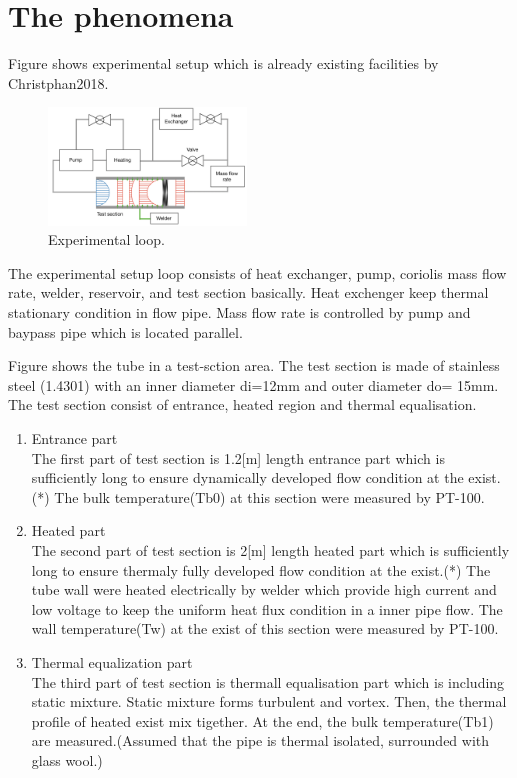 \documentclass[conference]{IEEEtran}
\begin{document}
\section{The phenomena}
Figure\label{experimental_loop} shows experimental setup which is already existing facilities by Christphan2018.
\begin{figure}[htbp]
  \centering
  \includegraphics[width=0.47\textwidth,natwidth=750,natheight=500]{fig/experimental_loop.png}
  \caption{Experimental loop.}
  \label{experimental_loop}
  \vspace{-2zh}
\end{figure}
The experimental setup loop consists of heat exchanger, pump, coriolis mass flow rate, welder, reservoir, and test section basically.
Heat exchenger keep thermal stationary condition in flow pipe.
Mass flow rate is controlled by pump and baypass pipe which is located parallel.

Figure\label{thermal_boundary_layer_development} shows the tube in a test-sction area.
The test section is made of stainless steel (1.4301) with an inner diameter di=12mm and outer diameter do= 15mm.
The test section consist of entrance, heated region and thermal equalisation.
\begin{enumerate}
  \item Entrance part\\
  The first part of test section is 1.2[m] length entrance part which is sufficiently long to ensure dynamically developed flow condition at the exist.(*) The bulk temperature(Tb0) at this section were measured by PT-100.
  \item Heated part\\
  The second part of test section is 2[m] length heated part which is sufficiently long to ensure thermaly fully developed flow condition at the exist.(*) The tube wall were heated electrically by welder which provide high current and low voltage to keep the uniform heat flux condition in a inner pipe flow. The wall temperature(Tw) at the exist of this section were measured by PT-100.
  \item Thermal equalization part\\
  The third part of test section is thermall equalisation part which is including static mixture. Static mixture forms turbulent and vortex. Then, the thermal profile of heated exist mix tigether. At the end, the bulk temperature(Tb1) are measured.(Assumed that the pipe is thermal isolated, surrounded with glass wool.)
\end{enumerate}
\end{document}

